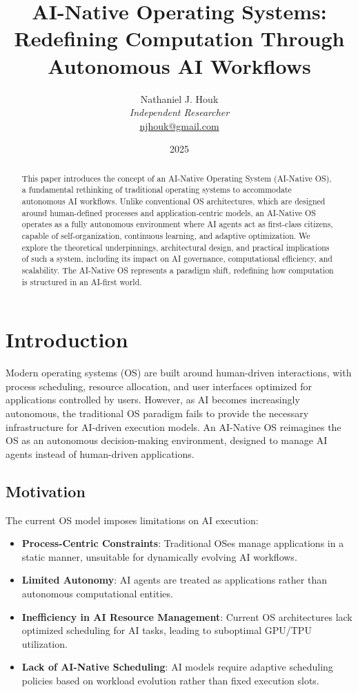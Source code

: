 \documentclass{article}
\title{AI-Native Operating Systems: Redefining Computation Through Autonomous AI Workflows}
\author{Nathaniel J. Houk\\
\textit{Independent Researcher}\\
\href{mailto:njhouk@gmail.com}{njhouk@gmail.com}}
\date{2025}
\begin{document}
\maketitle

\begin{abstract}
This paper introduces the concept of an AI-Native Operating System (AI-Native OS), a fundamental rethinking of traditional operating systems to accommodate autonomous AI workflows. Unlike conventional OS architectures, which are designed around human-defined processes and application-centric models, an AI-Native OS operates as a fully autonomous environment where AI agents act as first-class citizens, capable of self-organization, continuous learning, and adaptive optimization. We explore the theoretical underpinnings, architectural design, and practical implications of such a system, including its impact on AI governance, computational efficiency, and scalability. The AI-Native OS represents a paradigm shift, redefining how computation is structured in an AI-first world.
\end{abstract}

\section{Introduction}
Modern operating systems (OS) are built around human-driven interactions, with process scheduling, resource allocation, and user interfaces optimized for applications controlled by users. However, as AI becomes increasingly autonomous, the traditional OS paradigm fails to provide the necessary infrastructure for AI-driven execution models. An AI-Native OS reimagines the OS as an autonomous decision-making environment, designed to manage AI agents instead of human-driven applications.

\subsection{Motivation}
The current OS model imposes limitations on AI execution:
\begin{itemize}
    \item \textbf{Process-Centric Constraints}: Traditional OSes manage applications in a static manner, unsuitable for dynamically evolving AI workflows.
    \item \textbf{Limited Autonomy}: AI agents are treated as applications rather than autonomous computational entities.
    \item \textbf{Inefficiency in AI Resource Management}: Current OS architectures lack optimized scheduling for AI tasks, leading to suboptimal GPU/TPU utilization.
    \item \textbf{Lack of AI-Native Scheduling}: AI models require adaptive scheduling policies based on workload evolution rather than fixed execution slots.
\end{itemize}
\end{document}
